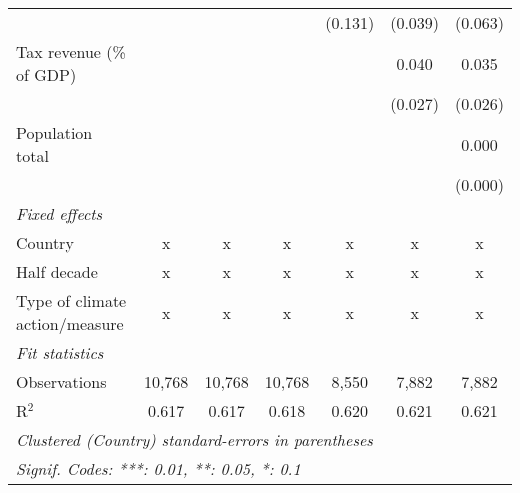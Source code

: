 \begin{tabular}{lcccccc}
                                                  &         &               &                & (0.131)        & (0.039)        & (0.063)\\   
   Tax revenue (\% of GDP)                        &         &               &                &                & 0.040          & 0.035\\   
                                                  &         &               &                &                & (0.027)        & (0.026)\\   
   Population total                               &         &               &                &                &                & 0.000\\   
                                                  &         &               &                &                &                & (0.000)\\   
   \emph{Fixed effects}\\
   Country                                        & x       & x             & x              & x              & x              & x\\  
   Half decade                                    & x       & x             & x              & x              & x              & x\\  
   Type of climate action/measure                 & x       & x             & x              & x              & x              & x\\  
   \midrule \emph{Fit statistics}\\
   Observations                                   & 10,768  & 10,768        & 10,768         & 8,550          & 7,882          & 7,882\\  
   R$^2$                                          & 0.617   & 0.617         & 0.618          & 0.620          & 0.621          & 0.621\\  
   \midrule
   \multicolumn{7}{l}{\emph{Clustered (Country) standard-errors in parentheses}}\\
   \multicolumn{7}{l}{\emph{Signif. Codes: ***: 0.01, **: 0.05, *: 0.1}}\\
\end{tabular}
\par\endgroup


